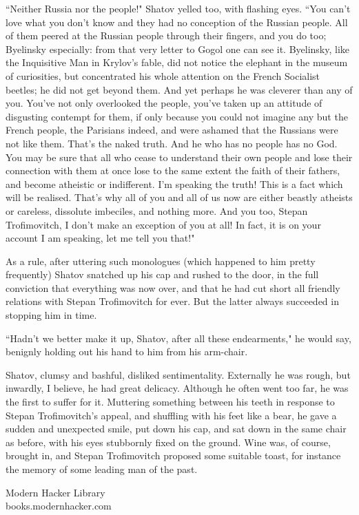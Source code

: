 \documentclass[12pt]{article}
\begin{document}
\vspace{12pt}
``Neither Russia nor the people!" Shatov yelled too, with flashing eyes.
``You can't love what you don't know and they had no conception of the
Russian people. All of them peered at the Russian people through their
fingers, and you do too; Byelinsky especially: from that very letter to
Gogol one can see it. Byelinsky, like the Inquisitive Man in Krylov's
fable, did not notice the elephant in the museum of curiosities, but
concentrated his whole attention on the French Socialist beetles; he did
not get beyond them. And yet perhaps he was cleverer than any of you.
You've not only overlooked the people, you've taken up an attitude of
disgusting contempt for them, if only because you could not imagine any
but the French people, the Parisians indeed, and were ashamed that the
Russians were not like them. That's the naked truth. And he who has
no people has no God. You may be sure that all who cease to understand
their own people and lose their connection with them at once lose to
the same extent the faith of their fathers, and become atheistic or
indifferent. I'm speaking the truth! This is a fact which will be
realised. That's why all of you and all of us now are either beastly
atheists or careless, dissolute imbeciles, and nothing more. And you
too, Stepan Trofimovitch, I don't make an exception of you at all! In
fact, it is on your account I am speaking, let me tell you that!"


\vspace{12pt}
As a rule, after uttering such monologues (which happened to him pretty
frequently) Shatov snatched up his cap and rushed to the door, in the
full conviction that everything was now over, and that he had cut short
all friendly relations with Stepan Trofimovitch for ever. But the latter
always succeeded in stopping him in time.


\vspace{12pt}
``Hadn't we better make it up, Shatov, after all these endearments," he
would say, benignly holding out his hand to him from his arm-chair.


\vspace{12pt}
Shatov, clumsy and bashful, disliked sentimentality. Externally he was
rough, but inwardly, I believe, he had great delicacy. Although he often
went too far, he was the first to suffer for it. Muttering something
between his teeth in response to Stepan Trofimovitch's appeal, and
shuffling with his feet like a bear, he gave a sudden and unexpected
smile, put down his cap, and sat down in the same chair as before, with
his eyes stubbornly fixed on the ground. Wine was, of course, brought
in, and Stepan Trofimovitch proposed some suitable toast, for instance
the memory of some leading man of the past.







\vfill
\begin{center}
{\selectfont 
Modern Hacker Library\\books.modernhacker.com}
\end{center}
\end{document}
